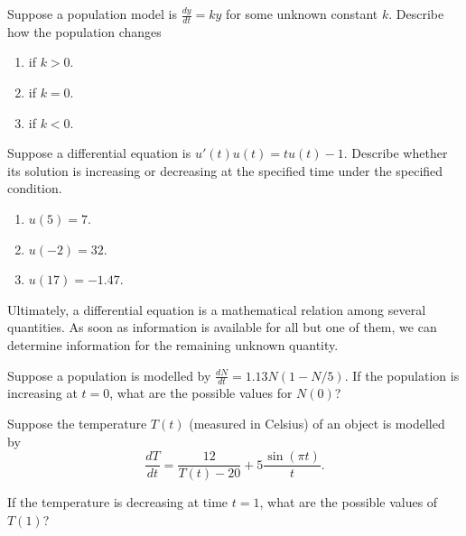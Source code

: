 \documentclass[../main.tex]{subfiles}
\begin{document}
\begin{example} \label{eg:DE-qualitative}
  Suppose a population model is \(\frac{dy}{dt} = ky\) for some unknown constant \(k\).  Describe how the population changes 
  \begin{enumerate}
    \item if \(k > 0\).
    \item if \(k = 0\).
    \item if \(k < 0\).
  \end{enumerate}
  
\end{example}

\begin{exercise} \label{ex:de-qualitative-implicit}
  Suppose a differential equation is \(u'(t) u(t) = t u(t) - 1\). Describe whether its solution is increasing or decreasing at the specified time under the specified condition.
  \begin{enumerate}
    \item \(u(5) = 7\).
    \item \(u(-2) = 32\).
    \item \(u(17) = -1.47\).
  \end{enumerate}

  \blanks*
\end{exercise}
\clearpage

Ultimately, a differential equation is a mathematical relation among several quantities.  As soon as information is available for all but one of them, we can determine information for the remaining unknown quantity.
\begin{example} \label{ex:de-possible-initial-values}
  Suppose a population is modelled by \(\frac{dN}{dt} = 1.13 N(1-N/5)\). If the population is increasing at \(t = 0\), what are the possible values for \(N(0)\)?

\end{example}

\begin{exercise} \label{ex:de-temperature-decreasing}
  Suppose the temperature \(T(t)\) (measured in Celsius) of an object is modelled by
  \[
    \frac{dT}{dt} = \frac{12}{T(t) - 20} + 5 \frac{\sin(\pi t)}{t}.
  \]

  If the temperature is decreasing at time \(t = 1\), what are the possible values of \(T(1)\)?

  \blanks*
\end{exercise}
\clearpage
\end{document}
